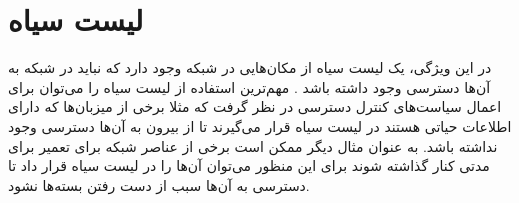 \documentclass[
msc,
irfonts
]{./tex/tehran-thesis}
\newcommand{\پ}{پروژه/پایان‌نامه/رساله }
\theoremstyle{definition}
\theoremstyle{theorem}
\theoremstyle{definition}
\numberwithin{algorithm}{chapter}
\newcommand{\lf}[1]{\LTRfootnote{#1}}
\begin{document}
\section{لیست سیاه}
در این ویژگی، یک لیست‌ سیاه\lf{Blacklist}
از مکان‌هایی در شبکه وجود دارد که نباید در شبکه به آن‌ها دسترسی وجود داشته باشد
\cite{network-abstractions}.
مهم‌ترین استفاده از لیست سیاه را می‌توان برای اعمال سیاست‌های کنترل دسترسی در نظر گرفت که مثلا برخی از میزبان‌ها که دارای اطلاعات حیاتی هستند در لیست سیاه قرار می‌گیرند تا از بیرون به آن‌ها دسترسی وجود نداشته باشد.
به عنوان مثال دیگر ممکن است برخی از عناصر شبکه برای تعمیر برای مدتی کنار گذاشته شوند برای این منظور می‌توان آن‌ها را در لیست سیاه قرار داد تا دسترسی به آن‌ها سبب از دست رفتن بسته‌ها نشود.
\begin{figure}
    \centering
    \caption{ }
    \label{fig:blacklist}
\end{figure}
\end{document}

